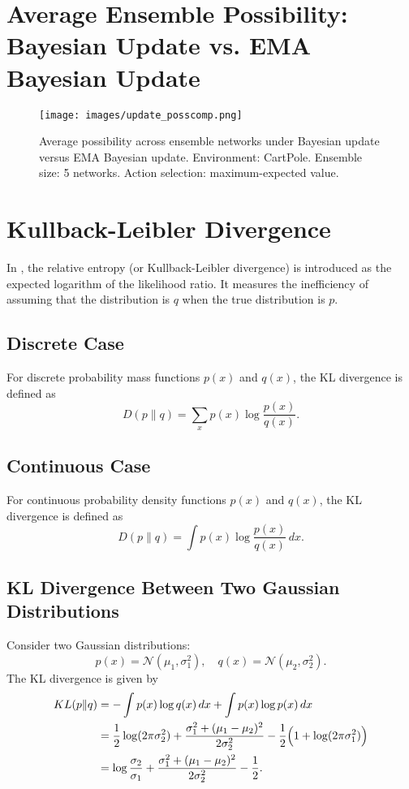 \documentclass[11pt,a4paper]{report}
\begin{document}
\section*{Average Ensemble Possibility: Bayesian Update vs. EMA Bayesian Update} \label{appendix:ens_poss_cmp}

\begin{figure}[H]
    \centering
    \texttt{[image: images/update\_posscomp.png]}
    \caption{
        Average possibility across ensemble networks under Bayesian update versus EMA Bayesian update.
        Environment: CartPole. Ensemble size: 5 networks. Action selection: maximum-expected value.
    }
\end{figure}
  
\section*{Kullback-Leibler Divergence} \label{appendix:kl}
In \cite{cover1991}, the relative entropy (or Kullback-Leibler divergence) is introduced as the expected logarithm of the likelihood ratio. It measures the inefficiency of assuming that the distribution is \(q\) when the true distribution is \(p\). 


\subsection*{Discrete Case}
For discrete probability mass functions \(p(x)\) and \(q(x)\), the KL divergence is defined as
\[
D(p\|q)= \sum_{x} p(x) \log \frac{p(x)}{q(x)}.
\]

\subsection*{Continuous Case}
For continuous probability density functions \(p(x)\) and \(q(x)\), the KL divergence is defined as
\[
D(p\|q)= \int p(x) \log \frac{p(x)}{q(x)}\, dx.
\]

\subsection*{KL Divergence Between Two Gaussian Distributions}
Consider two Gaussian distributions:
\[
p(x) = \mathcal{N}(\mu_1,\sigma_1^2), \quad q(x) = \mathcal{N}(\mu_2,\sigma_2^2).
\]
The KL divergence is given by
\[
\begin{aligned}
KL(p\|q) &= -\int p(x)\log q(x)\,dx + \int p(x)\log p(x)\,dx \\
&= \frac{1}{2}\log (2\pi\sigma_2^2) + \frac{\sigma_1^2+(\mu_1-\mu_2)^2}{2\sigma_2^2} - \frac{1}{2}\Bigl(1+\log(2\pi\sigma_1^2)\Bigr) \\
&= \log \frac{\sigma_2}{\sigma_1} + \frac{\sigma_1^2+(\mu_1-\mu_2)^2}{2\sigma_2^2} - \frac{1}{2}.
\end{aligned}
\]
\end{document}
